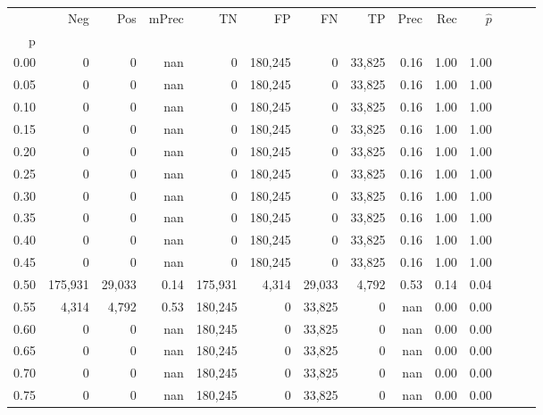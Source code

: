 \begin{tabular}{rrrrrrrrrrrrrr}
\toprule
{} &      Neg &     Pos & mPrec &       TN &       FP &      FN &      TP &  Prec &   Rec & $\hat{p}$ \\
p    &          &         &       &          &          &         &         &       &       &           \\
\midrule
0.00 &        0 &       0 &   nan &        0 &  180,245 &       0 &  33,825 &  0.16 &  1.00 &      1.00 \\
0.05 &        0 &       0 &   nan &        0 &  180,245 &       0 &  33,825 &  0.16 &  1.00 &      1.00 \\
0.10 &        0 &       0 &   nan &        0 &  180,245 &       0 &  33,825 &  0.16 &  1.00 &      1.00 \\
0.15 &        0 &       0 &   nan &        0 &  180,245 &       0 &  33,825 &  0.16 &  1.00 &      1.00 \\
0.20 &        0 &       0 &   nan &        0 &  180,245 &       0 &  33,825 &  0.16 &  1.00 &      1.00 \\
0.25 &        0 &       0 &   nan &        0 &  180,245 &       0 &  33,825 &  0.16 &  1.00 &      1.00 \\
0.30 &        0 &       0 &   nan &        0 &  180,245 &       0 &  33,825 &  0.16 &  1.00 &      1.00 \\
0.35 &        0 &       0 &   nan &        0 &  180,245 &       0 &  33,825 &  0.16 &  1.00 &      1.00 \\
0.40 &        0 &       0 &   nan &        0 &  180,245 &       0 &  33,825 &  0.16 &  1.00 &      1.00 \\
0.45 &        0 &       0 &   nan &        0 &  180,245 &       0 &  33,825 &  0.16 &  1.00 &      1.00 \\
0.50 &  175,931 &  29,033 &  0.14 &  175,931 &    4,314 &  29,033 &   4,792 &  0.53 &  0.14 &      0.04 \\
0.55 &    4,314 &   4,792 &  0.53 &  180,245 &        0 &  33,825 &       0 &   nan &  0.00 &      0.00 \\
0.60 &        0 &       0 &   nan &  180,245 &        0 &  33,825 &       0 &   nan &  0.00 &      0.00 \\
0.65 &        0 &       0 &   nan &  180,245 &        0 &  33,825 &       0 &   nan &  0.00 &      0.00 \\
0.70 &        0 &       0 &   nan &  180,245 &        0 &  33,825 &       0 &   nan &  0.00 &      0.00 \\
0.75 &        0 &       0 &   nan &  180,245 &        0 &  33,825 &       0 &   nan &  0.00 &      0.00 \\

\end{tabular}
